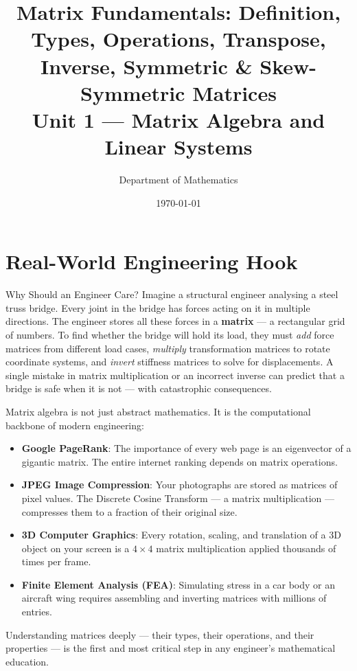 \documentclass[12pt,a4paper]{article}
\title{\textbf{Matrix Fundamentals: Definition, Types, Operations, Transpose, Inverse, Symmetric \& Skew-Symmetric Matrices} \\ \large Unit 1 --- Matrix Algebra and Linear Systems}
\author{Department of Mathematics}
\date{\today}
\begin{document}
\maketitle
\tableofcontents
\newpage

\section{Real-World Engineering Hook}

\begin{curiositybox}{Why Should an Engineer Care?}
Imagine a structural engineer analysing a steel truss bridge. Every joint in the bridge has forces acting on it in multiple directions. The engineer stores all these forces in a \textbf{matrix} --- a rectangular grid of numbers. To find whether the bridge will hold its load, they must \emph{add} force matrices from different load cases, \emph{multiply} transformation matrices to rotate coordinate systems, and \emph{invert} stiffness matrices to solve for displacements. A single mistake in matrix multiplication or an incorrect inverse can predict that a bridge is safe when it is not --- with catastrophic consequences.

Matrix algebra is not just abstract mathematics. It is the computational backbone of modern engineering:
\begin{itemize}
  \item \textbf{Google PageRank}: The importance of every web page is an eigenvector of a gigantic matrix. The entire internet ranking depends on matrix operations.
  \item \textbf{JPEG Image Compression}: Your photographs are stored as matrices of pixel values. The Discrete Cosine Transform --- a matrix multiplication --- compresses them to a fraction of their original size.
  \item \textbf{3D Computer Graphics}: Every rotation, scaling, and translation of a 3D object on your screen is a $4\times 4$ matrix multiplication applied thousands of times per frame.
  \item \textbf{Finite Element Analysis (FEA)}: Simulating stress in a car body or an aircraft wing requires assembling and inverting matrices with millions of entries.
\end{itemize}
Understanding matrices deeply --- their types, their operations, and their properties --- is the first and most critical step in any engineer's mathematical education.
\end{curiositybox}
\end{document}
